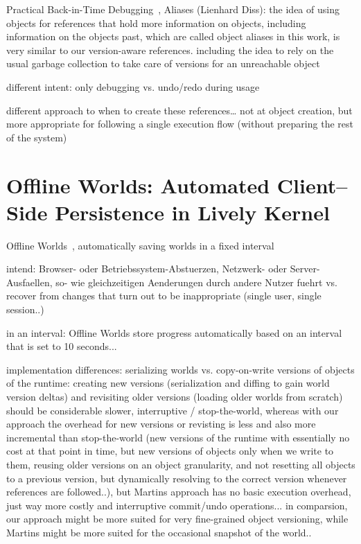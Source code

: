 Practical Back-in-Time Debugging~\cite{Lienhard2008POB}, Aliases (Lienhard Diss): the idea of using objects for references that hold more information on objects, including information on the objects past, which are called object aliases in this work, is very similar to our version-aware references. including the idea to rely on the usual garbage collection to take care of versions for an unreachable object

different intent: only debugging vs. undo/redo during usage

different approach to when to create these references… not at object creation, but more appropriate for following a single execution flow (without preparing the rest of the system)


\section{Offline Worlds: Automated Client–Side Persistence in Lively Kernel}
Offline Worlds~\cite{Czuchra2012OfW}, automatically saving worlds in a fixed interval

intend: Browser- oder Betriebssystem-Abstuerzen, Netzwerk- oder Server-Ausfaellen, so- wie gleichzeitigen Aenderungen durch andere Nutzer fuehrt
vs. recover from changes that turn out to be inappropriate (single user, single session..)

in an interval: Offline Worlds store progress automatically based on an interval that is set to 10 seconds...

implementation differences: serializing worlds vs. copy-on-write versions of objects of the runtime: creating new versions (serialization and diffing to gain world version deltas) and revisiting older versions (loading older worlds from scratch) should be considerable slower, interruptive / stop-the-world, whereas with our approach the overhead for new versions or revisting is less and also more incremental than stop-the-world (new versions of the runtime with essentially no cost at that point in time, but new versions of objects only when we write to them, reusing older versions on an object granularity, and not resetting all objects to a previous version, but dynamically resolving to the correct version whenever references are followed..), but Martins approach has no basic execution overhead, just way more costly and interruptive commit/undo operations... in comparsion, our approach might be more suited for very fine-grained object versioning, while Martins might be more suited for the occasional snapshot of the world..


